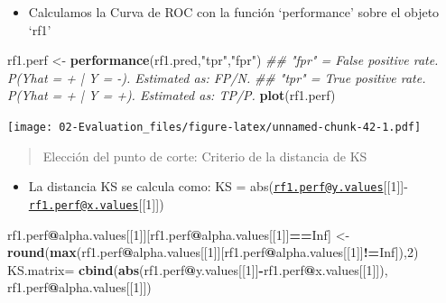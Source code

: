 \documentclass[]{book}
\newenvironment{Shaded}{\begin{snugshade}}{\end{snugshade}}
\newcommand{\CommentTok}[1]{\textcolor[rgb]{0.56,0.35,0.01}{\textit{#1}}}
\newcommand{\DecValTok}[1]{\textcolor[rgb]{0.00,0.00,0.81}{#1}}
\newcommand{\KeywordTok}[1]{\textcolor[rgb]{0.13,0.29,0.53}{\textbf{#1}}}
\newcommand{\NormalTok}[1]{#1}
\newcommand{\OperatorTok}[1]{\textcolor[rgb]{0.81,0.36,0.00}{\textbf{#1}}}
\newcommand{\OtherTok}[1]{\textcolor[rgb]{0.56,0.35,0.01}{#1}}
\newcommand{\StringTok}[1]{\textcolor[rgb]{0.31,0.60,0.02}{#1}}
\providecommand{\tightlist}{%
  \setlength{\itemsep}{0pt}\setlength{\parskip}{0pt}}
\begin{document}
\begin{itemize}
\tightlist
\item
  Calculamos la Curva de ROC con la función `performance' sobre el objeto `rf1'
\end{itemize}

\begin{Shaded}
\begin{Highlighting}[]
\NormalTok{  rf1.perf <-}\StringTok{ }\KeywordTok{performance}\NormalTok{(rf1.pred,}\StringTok{"tpr"}\NormalTok{,}\StringTok{"fpr"}\NormalTok{) }
 \CommentTok{## "fpr" = False positive rate. P(Yhat = + | Y = -). Estimated as: FP/N.}
 \CommentTok{## "tpr" = True positive rate. P(Yhat = + | Y = +). Estimated as: TP/P.}
 \KeywordTok{plot}\NormalTok{(rf1.perf)}
\end{Highlighting}
\end{Shaded}

\texttt{[image: 02-Evaluation\_files/figure-latex/unnamed-chunk-42-1.pdf]}

\begin{quote}
Elección del punto de corte: Criterio de la distancia de KS
\end{quote}

\begin{itemize}
\tightlist
\item
  La distancia KS se calcula como: KS = abs(\href{mailto:rf1.perf@y.values}{\nolinkurl{rf1.perf@y.values}}{[}{[}1{]}{]}-\href{mailto:rf1.perf@x.values}{\nolinkurl{rf1.perf@x.values}}{[}{[}1{]}{]})
\end{itemize}

\begin{Shaded}
\begin{Highlighting}[]
\NormalTok{rf1.perf}\OperatorTok{@}\NormalTok{alpha.values[[}\DecValTok{1}\NormalTok{]][rf1.perf}\OperatorTok{@}\NormalTok{alpha.values[[}\DecValTok{1}\NormalTok{]]}\OperatorTok{==}\OtherTok{Inf}\NormalTok{] <-}\StringTok{ }\KeywordTok{round}\NormalTok{(}\KeywordTok{max}\NormalTok{(rf1.perf}\OperatorTok{@}\NormalTok{alpha.values[[}\DecValTok{1}\NormalTok{]][rf1.perf}\OperatorTok{@}\NormalTok{alpha.values[[}\DecValTok{1}\NormalTok{]]}\OperatorTok{!=}\OtherTok{Inf}\NormalTok{]),}\DecValTok{2}\NormalTok{)}
\NormalTok{KS.matrix=}\StringTok{ }\KeywordTok{cbind}\NormalTok{(}\KeywordTok{abs}\NormalTok{(rf1.perf}\OperatorTok{@}\NormalTok{y.values[[}\DecValTok{1}\NormalTok{]]}\OperatorTok{-}\NormalTok{rf1.perf}\OperatorTok{@}\NormalTok{x.values[[}\DecValTok{1}\NormalTok{]]), rf1.perf}\OperatorTok{@}\NormalTok{alpha.values[[}\DecValTok{1}\NormalTok{]])}
\end{Highlighting}
\end{Shaded}
\end{document}
